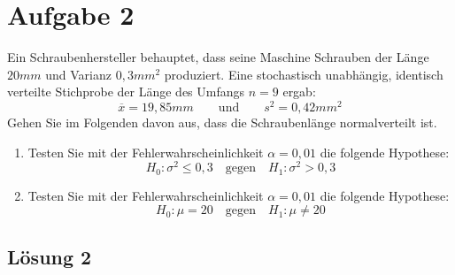 \documentclass[main.tex]{subfiles}
\begin{document}
\section{Aufgabe 2}
Ein Schraubenhersteller behauptet, dass seine Maschine Schrauben der Länge $20 mm$ und Varianz $0,3 mm^2$ produziert. Eine stochastisch unabhängig, identisch verteilte Stichprobe der Länge des Umfangs $n=9$ ergab:
$$ 
\overline{x} = 19,85mm
\qquad \text{und} \qquad 
s^2 = 0,42 mm^2 
$$
Gehen Sie im Folgenden davon aus, dass die Schraubenlänge normalverteilt ist.
\begin{enumerate}
\item Testen Sie mit der Fehlerwahrscheinlichkeit $\alpha = 0,01$ die folgende Hypothese:
$$ H_0: \sigma^2 \leq 0,3 \quad \mbox{gegen} \quad H_1: \sigma^2 > 0,3 $$
\item Testen Sie mit der Fehlerwahrscheinlichkeit $\alpha = 0,01$ die folgende Hypothese:
$$ H_0: \mu = 20 \quad \mbox{gegen} \quad H_1: \mu \neq 20 $$
\end{enumerate}

\subsection{Lösung 2}
\end{document}
